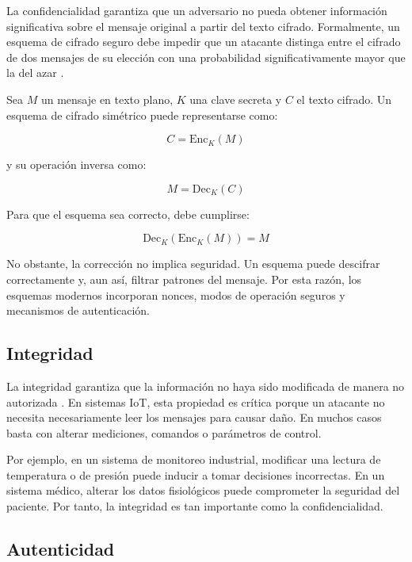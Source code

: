 La confidencialidad garantiza que un adversario no pueda obtener información significativa sobre el mensaje original a partir del texto cifrado. Formalmente, un esquema de cifrado seguro debe impedir que un atacante distinga entre el cifrado de dos mensajes de su elección con una probabilidad significativamente mayor que la del azar \cite{Katz2020IntroductionCryptography}.

Sea $M$ un mensaje en texto plano, $K$ una clave secreta y $C$ el texto cifrado. Un esquema de cifrado simétrico puede representarse como:

\begin{equation}
    C = \text{Enc}_{K}(M)
\end{equation}

y su operación inversa como:

\begin{equation}
    M = \text{Dec}_{K}(C)
\end{equation}

Para que el esquema sea correcto, debe cumplirse:

\begin{equation}
    \text{Dec}_{K}(\text{Enc}_{K}(M)) = M
\end{equation}

No obstante, la corrección no implica seguridad. Un esquema puede descifrar correctamente y, aun así, filtrar patrones del mensaje. Por esta razón, los esquemas modernos incorporan nonces, modos de operación seguros y mecanismos de autenticación.

\subsection{Integridad}

La integridad garantiza que la información no haya sido modificada de manera no autorizada \cite{Stallings2023CryptographyPractice}. En sistemas IoT, esta propiedad es crítica porque un atacante no necesita necesariamente leer los mensajes para causar daño. En muchos casos basta con alterar mediciones, comandos o parámetros de control.

Por ejemplo, en un sistema de monitoreo industrial, modificar una lectura de temperatura o de presión puede inducir a tomar decisiones incorrectas. En un sistema médico, alterar los datos fisiológicos puede comprometer la seguridad del paciente. Por tanto, la integridad es tan importante como la confidencialidad.

\subsection{Autenticidad}

